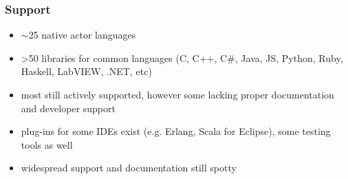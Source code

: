\begin{frame}
\frametitle{Support}
\begin{itemize}
\item $\sim$25 native actor languages
\item \textgreater 50 libraries for common languages (C, C++, C\#, Java, JS, Python, Ruby, Haskell, LabVIEW, .NET, etc)
\item most still actively supported, however some lacking proper documentation and developer support
\item plug-ins for some IDEs exist (e.g. Erlang, Scala for Eclipse), some testing tools as well
\item widespread support and documentation still spotty
\end{itemize}
\end{frame}